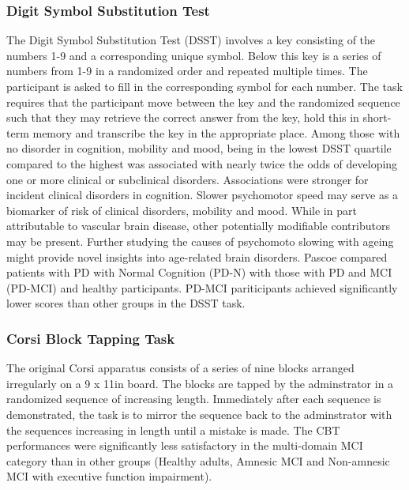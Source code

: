 \documentclass{article}
\begin{document}
\subsubsection{Digit Symbol Substitution Test}
The Digit Symbol Substitution Test (DSST) involves a key consisting of the numbers 1-9 and a corresponding unique symbol. Below this key is a series of numbers from 1-9 in a randomized order and repeated multiple times. The participant is asked to fill in the corresponding symbol for each number. The task requires that the participant move between the key and the randomized sequence such that  they may retrieve the correct answer from the key, hold this in short-term memory and transcribe the key in the appropriate place.
Among those with no disorder in cognition, mobility and mood, being in the lowest DSST quartile compared to the highest was associated with nearly twice the odds of developing one or more clinical or subclinical disorders. Associations were stronger for incident clinical disorders in cognition. Slower psychomotor speed may serve as a biomarker of risk of clinical disorders, mobility and mood. While in part attributable to vascular brain disease, other potentially modifiable contributors may be present. Further studying the causes of psychomoto slowing with ageing might provide novel insights into age-related brain disorders.
Pascoe compared patients with PD with Normal Cognition (PD-N) with those with PD and MCI (PD-MCI) and healthy participants. PD-MCI pariticipants achieved significantly lower scores than other groups in the DSST task.  
\subsubsection{Corsi Block Tapping Task}
The original Corsi apparatus consists of a series of nine blocks arranged irregularly on a 9 x 11in board. The blocks are tapped by the adminstrator in a randomized sequence of increasing length. Immediately after each sequence is demonstrated, the task is to mirror the sequence back to the adminstrator with the sequences increasing in length until a mistake is made.
The CBT performances were significantly less satisfactory in the multi-domain MCI category than in other groups (Healthy adults, Amnesic MCI and Non-amnesic MCI with executive function impairment).  
\end{document}
